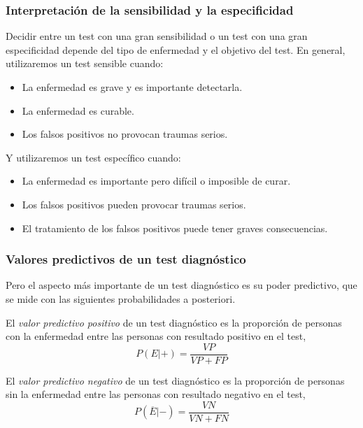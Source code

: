 \begin{frame}
\frametitle{Interpretación de la sensibilidad y la especificidad}
Decidir entre un test con una gran sensibilidad o un test con una gran especificidad depende del tipo de enfermedad y el objetivo del test.
En general, utilizaremos un test sensible cuando:
	\begin{itemize}
	\item La enfermedad es grave y es importante detectarla.
	\item La enfermedad es curable.
	\item Los falsos positivos no provocan traumas serios.
\end{itemize}
	
Y utilizaremos un test específico cuando:
\begin{itemize}
	\item La enfermedad es importante pero difícil o imposible de curar.
	\item Los falsos positivos pueden provocar traumas serios.
	\item El tratamiento de los falsos positivos puede tener graves consecuencias. 
	\end{itemize}
	\end{frame}
	

\begin{frame}
\frametitle{Valores predictivos de un test diagnóstico}
Pero el aspecto más importante de un test diagnóstico es su poder predictivo, que se mide con las siguientes probabilidades a posteriori.

\begin{definicion}
El \emph{valor predictivo positivo} de un test diagnóstico es la proporción de personas con la enfermedad entre las personas con resultado positivo en el test,
\[
	P(E|+) = \frac{VP}{VP+FP}
\]
\end{definicion}
	
\begin{definicion}
El \emph{valor predictivo negativo} de un test diagnóstico es la proporción de personas sin la enfermedad entre las personas con resultado negativo en el test,
\[
	P(\overline{E}|-) = \frac{VN}{VN+FN}
\]
\end{definicion}
\end{frame}



